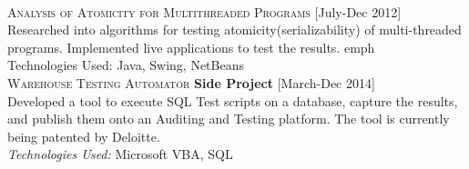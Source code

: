 \documentclass[letterpaper,12pt,final]{memoir}
\newcommand{\Sep}{\vspace{1.5em}}
\newcommand{\SmallSep}{\vspace{0.5em}}
\newcommand{\CVItem}[1]
	{\textsc{\color{Plum} #1}}
\newcommand{\plumBox}[1]
{\space\space\colorbox{Plum!10}{\tiny \textbf{{#1}}}}
\newcommand{\RightAlignedInlineText}[1]
{{\footnotesize \color{Plum}  \hfill [#1]}}
\begin{document}
\SmallSep\\
\CVItem{Analysis of Atomicity for Multithreaded Programs} \RightAlignedInlineText{July-Dec 2012}\\
{\footnotesize Researched into algorithms for testing atomicity(serializability) of multi-threaded programs. Implemented live applications to test the results. emph{\\Technologies Used:} Java, Swing, NetBeans}%
\SmallSep\\
\CVItem{Warehouse Testing Automator} \plumBox{Side Project} \RightAlignedInlineText{March-Dec 2014}\\
{\footnotesize Developed a tool to execute SQL Test scripts on a database, capture the results, and publish them onto an Auditing and Testing platform. The tool is currently being patented by Deloitte.\\ \emph{Technologies Used:} Microsoft VBA, SQL} 
\end{document}
